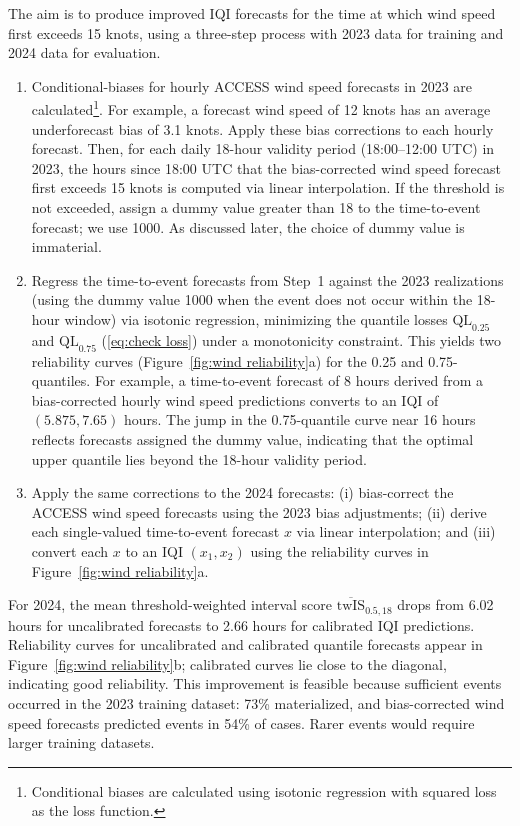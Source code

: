 \documentclass[10pt]{article} %
\theoremstyle{theorem}
\theoremstyle{definition}
\newcommand{\QL}{\mathrm{QL}}
\newcommand{\twIS}{\mathrm{twIS}}
\begin{document}
The aim is to produce improved IQI forecasts for the time at which wind speed first exceeds 15 knots, using a three-step process with 2023 data for training and 2024 data for evaluation.
\begin{enumerate}
\item Conditional-biases for hourly ACCESS wind speed forecasts in 2023 are calculated\footnote{Conditional biases are calculated using isotonic regression with squared loss as the loss function.}. For example, a forecast wind speed of 12 knots has an average underforecast bias of 3.1 knots. Apply these bias corrections to each hourly forecast. Then, for each daily 18-hour validity period (18:00--12:00 UTC) in 2023, the hours since 18:00 UTC that the bias-corrected wind speed forecast first exceeds 15 knots is computed via linear interpolation. If the threshold is not exceeded, assign a dummy value greater than 18 to the time-to-event forecast; we use 1000. As discussed later, the choice of dummy value is immaterial.
\item Regress the time-to-event forecasts from Step~1 against the 2023 realizations (using the dummy value 1000 when the event does not occur within the 18-hour window) via isotonic regression, minimizing the quantile losses $\QL_{0.25}$ and $\QL_{0.75}$ (\ref{eq:check loss}) under a monotonicity constraint. This yields two reliability curves (Figure~\ref{fig:wind reliability}a) for the 0.25 and 0.75-quantiles. For example, a time-to-event forecast of 8 hours derived from a bias-corrected hourly wind speed predictions converts to an IQI of $(5.875, 7.65)$ hours. The jump in the 0.75-quantile curve near 16 hours reflects forecasts assigned the dummy value, indicating that the optimal upper quantile lies beyond the 18-hour validity period.
\item Apply the same corrections to the 2024 forecasts: (i) bias-correct the ACCESS wind speed forecasts using the 2023 bias adjustments; (ii) derive each single-valued time-to-event forecast $x$ via linear interpolation; and (iii) convert each $x$ to an IQI $(x_1, x_2)$ using the reliability curves in Figure~\ref{fig:wind reliability}a.
\end{enumerate}

For 2024, the mean threshold-weighted interval score $\overline{\twIS}_{0.5,18}$ drops from 6.02 hours for uncalibrated forecasts to 2.66 hours for calibrated IQI predictions. Reliability curves for uncalibrated and calibrated quantile forecasts appear in Figure~\ref{fig:wind reliability}b; calibrated curves lie close to the diagonal, indicating good reliability. This improvement is feasible because sufficient events occurred in the 2023 training dataset: 73\% materialized, and bias-corrected wind speed forecasts predicted events in 54\% of cases. Rarer events would require larger training datasets.
\end{document}
